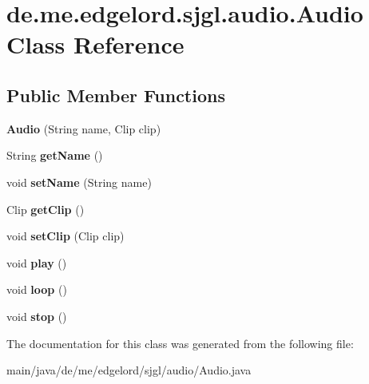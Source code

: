 \hypertarget{classde_1_1me_1_1edgelord_1_1sjgl_1_1audio_1_1_audio}{}\section{de.\+me.\+edgelord.\+sjgl.\+audio.\+Audio Class Reference}
\label{classde_1_1me_1_1edgelord_1_1sjgl_1_1audio_1_1_audio}
\subsection*{Public Member Functions}
\begin{DoxyCompactItemize}
\item 
\mbox{\label{classde_1_1me_1_1edgelord_1_1sjgl_1_1audio_1_1_audio_a13ee311071d7068e5ae7997b0266a3c5}} 
{\bfseries Audio} (String name, Clip clip)
\item 
\mbox{\label{classde_1_1me_1_1edgelord_1_1sjgl_1_1audio_1_1_audio_a4b34b06bc7440c084249ae098eb8fe06}} 
String {\bfseries get\+Name} ()
\item 
\mbox{\label{classde_1_1me_1_1edgelord_1_1sjgl_1_1audio_1_1_audio_aa9b4566ab537ed67744c38887839d8a3}} 
void {\bfseries set\+Name} (String name)
\item 
\mbox{\label{classde_1_1me_1_1edgelord_1_1sjgl_1_1audio_1_1_audio_ad3571669b120139b2343b5fa7a225298}} 
Clip {\bfseries get\+Clip} ()
\item 
\mbox{\label{classde_1_1me_1_1edgelord_1_1sjgl_1_1audio_1_1_audio_aba8fc977249cf5f42d2b5df7272e081b}} 
void {\bfseries set\+Clip} (Clip clip)
\item 
\mbox{\label{classde_1_1me_1_1edgelord_1_1sjgl_1_1audio_1_1_audio_ac87651401394ee2e141c099a175cd7cb}} 
void {\bfseries play} ()
\item 
\mbox{\label{classde_1_1me_1_1edgelord_1_1sjgl_1_1audio_1_1_audio_a654692b8ee1f0d298af938b2c76e6a54}} 
void {\bfseries loop} ()
\item 
\mbox{\label{classde_1_1me_1_1edgelord_1_1sjgl_1_1audio_1_1_audio_a2e9d9c2e43c4bab399c7f360c8f90ce2}} 
void {\bfseries stop} ()
\end{DoxyCompactItemize}


The documentation for this class was generated from the following file\+:\begin{DoxyCompactItemize}
\item 
main/java/de/me/edgelord/sjgl/audio/Audio.\+java\end{DoxyCompactItemize}
